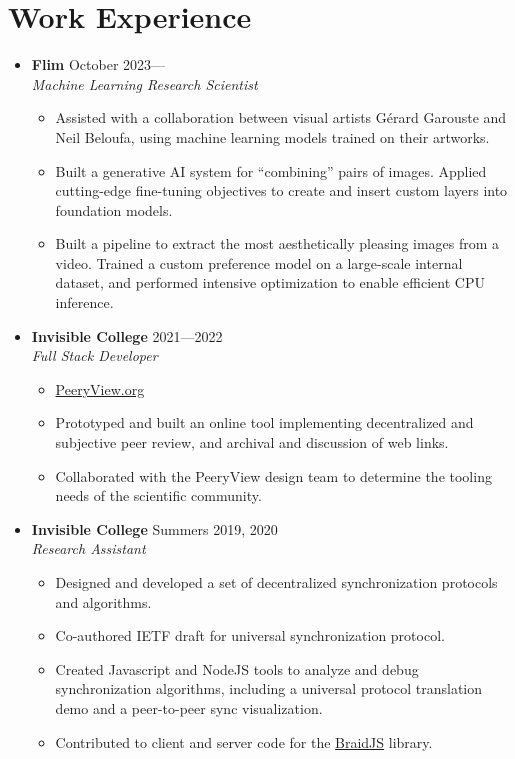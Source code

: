 \documentclass[12pt,letterpaper]{article}
\newenvironment{explist}
{\begin{itemize}[label=\textbf{--},itemsep=1pt,topsep=0pt,partopsep=0pt,parsep=0pt]}
{\end{itemize}}
\begin{document}
\section*{Work Experience} \vspace{-0.5em}
\begin{itemize}[label=]
    \item
        \textbf{Flim} \hfill October 2023---\\
        \textit{Machine Learning Research Scientist}
        \begin{explist}
        \item Assisted with a collaboration between visual artists G\'erard Garouste and Neil Beloufa, using machine learning models trained on their artworks.
        \item Built a generative AI system for ``combining'' pairs of images.
            Applied cutting-edge fine-tuning objectives to create and insert custom layers into foundation models.
        \item Built a pipeline to extract the most aesthetically pleasing images from a video.
            Trained a custom preference model on a large-scale internal dataset,
            and performed intensive optimization to enable efficient CPU inference.
        \end{explist}

    \item
        \textbf{Invisible College} \hfill 2021---2022\\
        \textit{Full Stack Developer}
        \begin{explist}
        \item \href{https://peeryview.org}{PeeryView.org}
        \item Prototyped and built an online tool implementing decentralized and subjective peer review, and archival and discussion of web links.
        \item Collaborated with the PeeryView design team to determine the tooling needs of the scientific community.
        \end{explist}
    \item
        \textbf{Invisible College} \hfill Summers 2019, 2020\\
        \textit{Research Assistant}
        \begin{explist}
        \item Designed and developed a set of decentralized synchronization protocols and algorithms.
        \item Co-authored IETF draft for universal synchronization protocol.
        \item Created Javascript and NodeJS tools to analyze and debug synchronization algorithms, including a universal protocol translation demo and a peer-to-peer sync visualization.
        \item Contributed to client and server code for the \href{https://github.com/braid-work/braidjs}{BraidJS} library.
        \end{explist}


\end{itemize}
\end{document}
